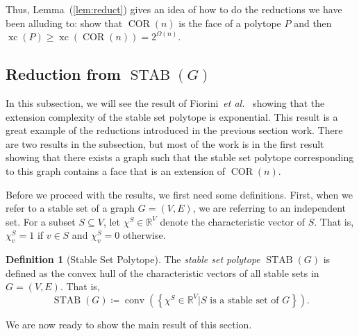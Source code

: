 \documentclass{article}
\makeatletter
\theoremstyle{definition}
\newtheorem{definition}[theorem]{Definition}
\theoremstyle{remark}
\newcommand{\cetal}{\textit{et al.\@}}  %
\newcommand{\conv}{\operatorname{conv}}
\newcommand{\xc}{\operatorname{xc}}
\newcommand{\STAB}{\operatorname{STAB}}
\newcommand{\COR}{\operatorname{COR}}
\renewcommand{\R}{\mathbb{R}}
\makeatother
\begin{document}
Thus, Lemma~(\ref{lem:reduct}) gives an idea of how to do the reductions we have been alluding to: show that $\COR(n)$ is the face of a polytope $P$ and then $\xc(P) \ge \xc(\COR(n)) =2^{\Omega(n)}$.


\subsection{Reduction from $\STAB(G)$}

In this subsection, we will see the result of Fiorini~\cetal~\cite{fiorini} showing that the extension complexity of the stable set polytope is exponential. This result is a great example of the reductions introduced in the previous section work. There are two results in the subsection, but most of the work is in the first result showing that there exists a graph such that the stable set polytope corresponding to this graph contains a face that is an extension of $\COR(n)$. 

Before we proceed with the results, we first need some definitions. First, when we refer to a stable set of a graph $G = (V,E)$, we are referring to an independent set. For a subset $S \subseteq V$, let $\chi^S \in \R^V$ denote the characteristic vector of $S$. That is, $\chi_v^S = 1$ if $v \in S$ and $\chi_v^S = 0$ otherwise. 

\begin{definition}[Stable Set Polytope]
The \emph{stable set polytope} $\STAB(G)$ is defined as the convex hull of the characteristic vectors of all stable sets in $G = (V, E)$. That is,
\[
\STAB(G) \coloneqq \conv\left(\left\{\chi^S \in \R^V | S \text{ is a stable set of $G$}\right\}\right).
\]
\end{definition}

We are now ready to show the main result of this section.
\end{document}
